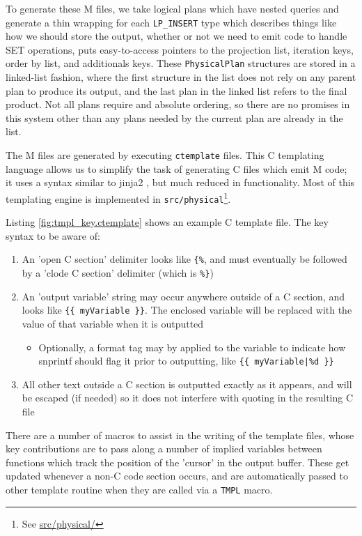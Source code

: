 \documentclass[]{article}
\def\code#1{\texttt{#1}}
\newcommand{\gitlab}[1]{\footnote{See \href{https://gitlab.com/YottaDB/DBMS/YDBOcto/blob/master/#1}{#1}}}
\begin{document}
To generate these M files, we take logical plans which have nested queries and generate a thin wrapping for each \code{LP\_INSERT} type which describes things like how we should store the output, whether or not we need to emit code to handle SET operations, puts easy-to-access pointers to the projection list, iteration keys, order by list, and additionals keys.
These \code{PhysicalPlan} structures are stored in a linked-list fashion, where the first structure in the list does not rely on any parent plan to produce its output, and the last plan in the linked list refers to the final product.
Not all plans require and absolute ordering, so there are no promises in this system other than any plans needed by the current plan are already in the list.

The M files are generated by executing \code{ctemplate} files.
This C templating language allows us to simplify the task of generating C files which emit M code; it uses a syntax similar to jinja2 \cite{jinja2}, but much reduced in functionality.
Most of this templating engine is implemented in \code{src/physical}\gitlab{src/physical/}.

Listing \ref{fig:tmpl_key.ctemplate} shows an example C template file.
The key syntax to be aware of:

\begin{enumerate}
	\item An 'open C section' delimiter looks like \code{\{\%}, and must eventually be followed by a 'clode C section' delimiter (which is \code{\%\}})
	\item An 'output variable' string may occur anywhere outside of a C section, and looks like \code{\{\{ myVariable \}\}}. The enclosed variable will be replaced with the value of that variable when it is outputted
	\begin{itemize}
		\item Optionally, a format tag may by applied to the variable to indicate how snprintf should flag it prior to outputting, like \code{\{\{ myVariable|\%d \}\}}
	\end{itemize}
	\item All other text outside a C section is outputted exactly as it appears, and will be escaped (if needed) so it does not interfere with quoting in the resulting C file
\end{enumerate}

There are a number of macros to assist in the writing of the template files, whose key contributions are to pass along a number of implied variables between functions which track the position of the 'cursor' in the output buffer.
These get updated whenever a non-C code section occurs, and are automatically passed to other template routine when they are called via a \code{TMPL} macro.
\end{document}
